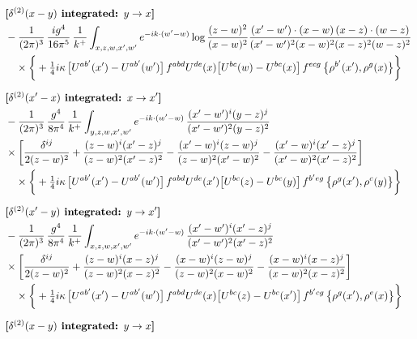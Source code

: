\documentclass[10pt]{article}
\numberwithin{equation}{section}
\begin{document}
\begin{align}
&\textbf{[$\delta^{(2)}(x-y)$ integrated: $y\to x$]}\notag\\
&-\frac{1}{(2\pi)^{3}}\,\frac{ig^{4}}{16\pi^{5}}\,\frac{1}{k^{+}}\int_{x,z,w,x^{\prime},w^{\prime}}e^{-ik\cdot(w^{\prime}-w)}\log\frac{(z-w)^{2}}{(x-w)^{2}}\frac{(x^{\prime}-w^{\prime})\cdot(x-w)\,(x-z)\cdot(w-z)}{(x^{\prime}-w^{\prime})^{2}(x-w)^{2}(x-z)^{2}(w-z)^{2}}\notag\\
&\quad\times\bigg\{+\tfrac14 i\kappa\,\big[U^{ab^{\prime}}(x^{\prime})-U^{ab^{\prime}}(w^{\prime})\big]\,f^{abd}U^{de}(x)\big[U^{bc}(w)-U^{bc}(x)\big]\,f^{ecg}\,\big\{\rho^{b^{\prime}}(x^{\prime}),\rho^{g}(x)\big\}\bigg\}\notag\\[6pt]
&\textbf{[$\delta^{(2)}(x^{\prime}-x)$ integrated: $x\to x^{\prime}$]}\notag\\
&-\frac{1}{(2\pi)^{3}}\,\frac{g^{4}}{8\pi^{4}}\,\frac{1}{k^{+}}\int_{y,z,w,x^{\prime},w^{\prime}}e^{-ik\cdot(w^{\prime}-w)}\,\frac{(x^{\prime}-w^{\prime})^{i}(y-z)^{j}}{(x^{\prime}-w^{\prime})^{2}(y-z)^{2}}\notag\\
&\times\bigg[\frac{\delta^{ij}}{2(z-w)^{2}}+\frac{(z-w)^{i}(x^{\prime}-z)^{j}}{(z-w)^{2}(x^{\prime}-z)^{2}}-\frac{(x^{\prime}-w)^{i}(z-w)^{j}}{(z-w)^{2}(x^{\prime}-w)^{2}}-\frac{(x^{\prime}-w)^{i}(x^{\prime}-z)^{j}}{(x^{\prime}-w)^{2}(x^{\prime}-z)^{2}}\bigg]\notag\\
&\quad\times\bigg\{+\tfrac14 i\kappa\,\big[U^{ab^{\prime}}(x^{\prime})-U^{ab^{\prime}}(w^{\prime})\big]\,f^{abd}U^{de}(x^{\prime})\big[U^{bc}(z)-U^{bc}(y)\big]\,f^{b^{\prime}eg}\,\big\{\rho^{g}(x^{\prime}),\rho^{c}(y)\big\}\bigg\}\notag\\[6pt]
&\textbf{[$\delta^{(2)}(x^{\prime}-y)$ integrated: $y\to x^{\prime}$]}\notag\\
&-\frac{1}{(2\pi)^{3}}\,\frac{g^{4}}{8\pi^{4}}\,\frac{1}{k^{+}}\int_{x,z,w,x^{\prime},w^{\prime}}e^{-ik\cdot(w^{\prime}-w)}\,\frac{(x^{\prime}-w^{\prime})^{i}(x^{\prime}-z)^{j}}{(x^{\prime}-w^{\prime})^{2}(x^{\prime}-z)^{2}}\notag\\
&\times\bigg[\frac{\delta^{ij}}{2(z-w)^{2}}+\frac{(z-w)^{i}(x-z)^{j}}{(z-w)^{2}(x-z)^{2}}-\frac{(x-w)^{i}(z-w)^{j}}{(z-w)^{2}(x-w)^{2}}-\frac{(x-w)^{i}(x-z)^{j}}{(x-w)^{2}(x-z)^{2}}\bigg]\notag\\
&\quad\times\bigg\{+\tfrac14 i\kappa\,\big[U^{ab^{\prime}}(x^{\prime})-U^{ab^{\prime}}(w^{\prime})\big]\,f^{abd}U^{de}(x)\big[U^{bc}(z)-U^{bc}(x^{\prime})\big]\,f^{b^{\prime}cg}\,\big\{\rho^{g}(x^{\prime}),\rho^{e}(x)\big\}\bigg\}\notag\\[6pt]
&\textbf{[$\delta^{(2)}(x-y)$ integrated: $y\to x$]}\notag\\

\end{align}
\end{document}
